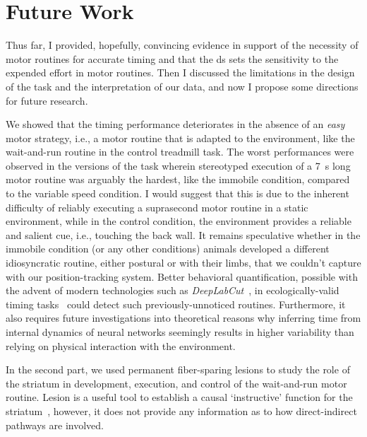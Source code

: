 \section{Future Work}
Thus far, I provided, hopefully, convincing evidence in support of the necessity of motor routines for accurate timing and that the \gls{ds} sets the sensitivity to the expended effort in motor routines.
Then I discussed the limitations in the design of the task and the interpretation of our data, and now I propose some directions for future research.
\par
We showed that the timing performance deteriorates in the absence of an \textit{easy} motor strategy, i.e., a motor routine that is adapted to the environment, like the wait-and-run routine in the control treadmill task.
The worst performances were observed in the versions of the task wherein stereotyped execution of a 7~s long motor routine was arguably the hardest, like the immobile condition, compared to the variable speed condition.
I would suggest that this is due to the inherent difficulty of reliably executing a suprasecond motor routine in a static environment, while in the control condition, the environment provides a reliable and salient cue, i.e., touching the back wall.
It remains speculative whether in the immobile condition (or any other conditions) animals developed a different idiosyncratic routine, either postural or with their limbs, that we couldn't capture with our position-tracking system.
Better behavioral quantification, possible with the advent of modern technologies such as \textit{DeepLabCut}~\cite{DeepLabCut2018NN}, in ecologically-valid timing tasks~\cite{VanRijn2018TICS} could detect such previously-unnoticed routines.
Furthermore, it also requires future investigations into theoretical reasons why inferring time from internal dynamics of neural networks seemingly results in higher variability than relying on physical interaction with the environment.
\par
In the second part, we used permanent fiber-sparing lesions to study the role of the striatum in development, execution, and control of the wait-and-run motor routine.
Lesion is a useful tool to establish a causal `instructive' function for the striatum~\cite{Otchy2015Nature}, however, it does not provide any information as to how direct-indirect pathways are involved.
